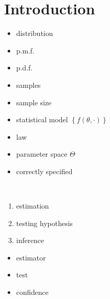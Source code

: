 \section{Introduction}\label{sec:introduction}

\begin{itemize}
    \item distribution
    \item p.m.f.
    \item p.d.f.
    \item samples
    \item sample size
    \item statistical model $\left\{ f(\theta, \cdot) \right\}$
    \item law
    \item parameter space $\Theta$
    \item correctly specified
\end{itemize}

\begin{fact}\,
    \begin{enumerate}
        \item estimation
        \item testing hypothesis
        \item inference
    \end{enumerate}
\end{fact}

\begin{itemize}
    \item estimator
    \item test
    \item confidence
\end{itemize}